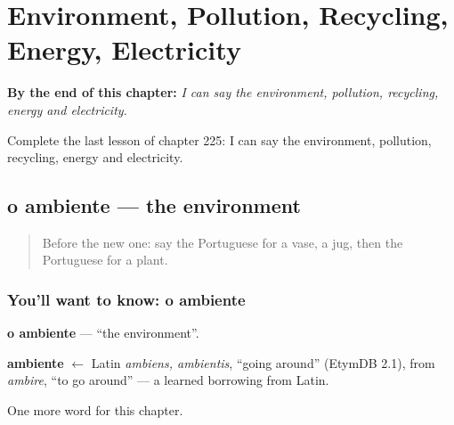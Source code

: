 
\chapter{Environment, Pollution, Recycling, Energy, Electricity}
\label{ch:pt-environment-pollution-recycling-energy-electricity}

\begin{chapteropening}
\textbf{By the end of this chapter:} \emph{I can say the environment, pollution, recycling, energy and electricity.}

Complete the last lesson of chapter 225: I can say the environment, pollution, recycling, energy and electricity.
\end{chapteropening}

\section[o ambiente]{o ambiente — the environment}

\label{lesson:PT-C225-ambiente}



\begin{quote}
Before the new one: say the Portuguese for a vase, a jug, then the Portuguese for a plant.
\end{quote}

\subsection*{You'll want to know: o ambiente}
\textbf{o ambiente} — \textquotedblleft{}the environment\textquotedblright{}.

\begin{cousinweb}
\textbf{ambiente} $\leftarrow$ Latin \emph{ambiens, ambientis}, \textquotedblleft{}going around\textquotedblright{} (EtymDB 2.1), from \emph{ambire}, \textquotedblleft{}to go around\textquotedblright{} — a learned borrowing from Latin.
\end{cousinweb}

\begin{grammarlens}[title={What you've built}]
One more word for this chapter.
\end{grammarlens}

